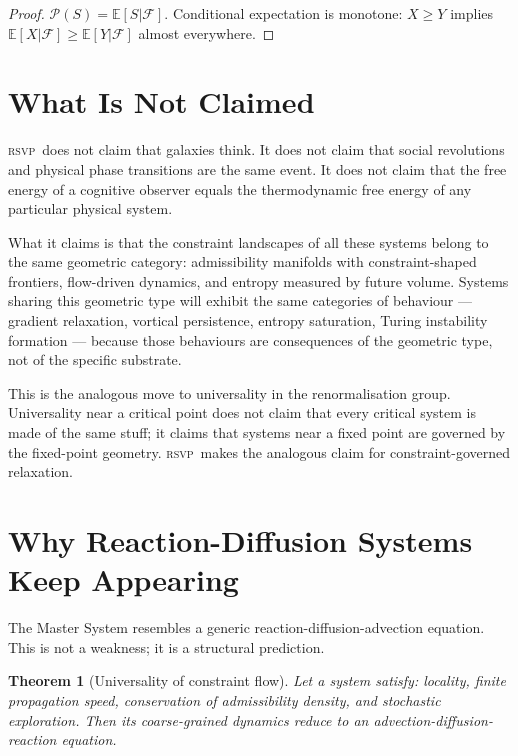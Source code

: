 \documentclass[12pt, oneside]{book}
\theoremstyle{plain}
\newtheorem{theorem}{Theorem}[chapter]
\theoremstyle{definition}
\newcommand{\RSVP}{\textsc{rsvp}}
\begin{document}
\begin{proof}
$\mathcal{P}(S) = \mathbb{E}[S|\mathcal{F}]$. Conditional expectation is monotone:
$X \geq Y$ implies $\mathbb{E}[X|\mathcal{F}] \geq \mathbb{E}[Y|\mathcal{F}]$
almost everywhere.
\end{proof}

\section{What Is Not Claimed}
\label{sec:not-claimed}

\RSVP\ does not claim that galaxies think. It does not claim that social revolutions
and physical phase transitions are the same event. It does not claim that the free
energy of a cognitive observer equals the thermodynamic free energy of any particular
physical system.

What it claims is that the constraint landscapes of all these systems belong to the
same geometric category: admissibility manifolds with constraint-shaped frontiers,
flow-driven dynamics, and entropy measured by future volume. Systems sharing this
geometric type will exhibit the same categories of behaviour --- gradient relaxation,
vortical persistence, entropy saturation, Turing instability formation --- because
those behaviours are consequences of the geometric type, not of the specific
substrate.

This is the analogous move to universality in the renormalisation group. Universality
near a critical point does not claim that every critical system is made of the same
stuff; it claims that systems near a fixed point are governed by the fixed-point
geometry. \RSVP\ makes the analogous claim for constraint-governed relaxation.

\section{Why Reaction-Diffusion Systems Keep Appearing}
\label{sec:rda}

The Master System resembles a generic reaction-diffusion-advection equation. This
is not a weakness; it is a structural prediction.

\begin{theorem}[Universality of constraint flow]
\label{thm:universality}
Let a system satisfy: locality, finite propagation speed, conservation of
admissibility density, and stochastic exploration. Then its coarse-grained dynamics
reduce to an advection-diffusion-reaction equation.
\end{theorem}
\end{document}
